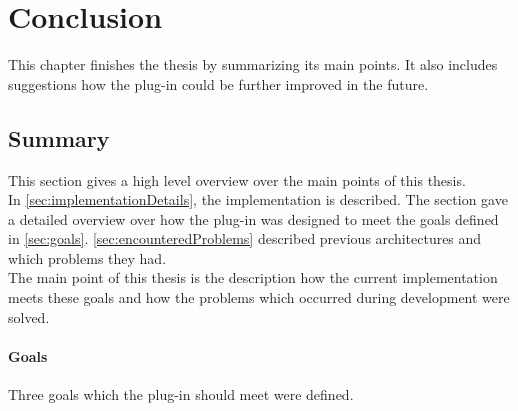 
\chapter{Conclusion}
\label{chap:conclusion}

This chapter finishes the thesis by summarizing its main points. It also includes suggestions how the plug-in could be further improved in the future.

\section{Summary}
\label{sec:summary}

This section gives a high level overview over the main points of this thesis. \\
In \autoref{sec:implementationDetails}, the implementation is described. The section gave a detailed overview over how the plug-in was designed to meet the goals defined in \autoref{sec:goals}. \autoref{sec:encounteredProblems} described previous architectures and which problems they had.\\
The main point of this thesis is the description how the current implementation meets these goals and how the problems which occurred during development were solved.

\subsubsection{Goals}

Three goals which the plug-in should meet were defined.

